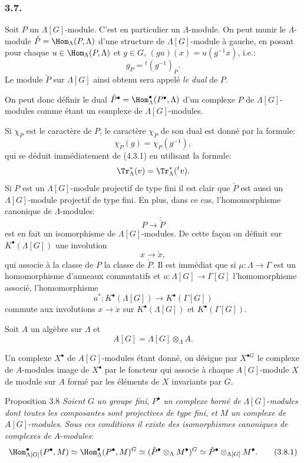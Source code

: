 \subsubsection*{3.7.}

Soit $P$ un $\Lambda[G]$-module. C'est en particulier un $\Lambda$-module. On peut munir le $\Lambda$-module $\check P=\Hom_\Lambda(P,\Lambda)$ d'une structure de $\Lambda[G]$-module à gauche, en posant pour chaque $u\in\Hom_\Lambda(P,\Lambda)$ et $g\in G$, $(gu)(x)=u(g^{-1}x)$, i.e.:
\[
g_P={}^{t}(g^{-1})_P.
\tag{3.7.1}
\]
Le module $\check P$ sur $\Lambda[G]$ ainsi obtenu sera appelé \emph{le dual} de $P$.

On peut donc définir le dual $\check P^\bullet=\Hom_\Lambda^\bullet(P^\bullet,\Lambda)$ d'un complexe $P$ de $\Lambda[G]$-modules comme étant un complexe de $\Lambda[G]$-modules.

Si $\chi_P$ est le caractère de $P$, le caractère $\chi_{\check P}$ de son dual est donné par la formule:
\[
\chi_{\check P}(g)=\chi_P(g^{-1}),
\tag{3.7.2}
\]
qui se déduit immédiatement de (4.3.1) en utilisant la formule:
\[
\Tr_\Lambda^*(v)=\Tr_\Lambda^*({}^{t}v).
\]
Si $P$ est un $\Lambda[G]$-module projectif de type fini il est clair que $\check P$ est aussi un $\Lambda[G]$-module projectif de type fini. En plus, dans ce cas, l'homomorphisme canonique de $\Lambda$-modules:
\[
P\longrightarrow\check{\check P}
\]
est en fait un isomorphisme de $\Lambda[G]$-modules. De cette façon on définit sur $K^{\bullet}(\Lambda[G])$ une involution
\[
x\longrightarrow \check x,
\]
qui associe à la classe de $P$ la classe de $\check P$. Il est immédiat que si $\mu:\Lambda\to\Gamma$ est un homomorphisme d'anneaux commutatifs et $u:\Lambda[G]\to\Gamma[G]$ l'homomorphisme associé, l'homomorphisme
\[
u^*:K^{\bullet}(\Lambda[G])\longrightarrow K^{\bullet}(\Gamma[G])
\]
commute aux involutions $x\longrightarrow \check x$ sur 
$K^{\bullet}(\Lambda[G])$ et $K^{\bullet}(\Gamma[G])$.

Soit $A$ un algèbre sur $\Lambda$ et
\[
A[G]=\Lambda[G]\otimes_\Lambda A.
\]

Un complexe $X^\bullet$ de $A[G]$-modules étant donné, on désigne par $X^{\bullet G}$ le complexe de $A$-modules image de $X^\bullet$ par le foncteur qui associe à chaque $A[G]$-module $X$ de module sur $A$ formé par les éléments de $X$ invariants par $G$.

\begin{statement}{Proposition 3.8}
\emph{Soient} $G$ \emph{un groupe fini}, $P^\bullet$ \emph{un complexe borné de} $\Lambda[G]$-\emph{modules dont toutes les composantes sont projectives de type fini}, \emph{et} $M$ \emph{un complexe de} $A[G]$-\emph{modules}. \emph{Sous ces conditions il existe des isomorphismes canoniques de complexes de} $A$-\emph{modules}:
\[
\Hom_{\Lambda[G]}^\bullet(P^\bullet,M)
\simeq \Hom_\Lambda^\bullet(P^\bullet,M)^G
\simeq (\check P^\bullet\otimes_\Lambda M^\bullet)^G
\simeq \check P^\bullet\otimes_{\Lambda[G]}M^\bullet.
\tag{3.8.1}
\]
\end{statement}

